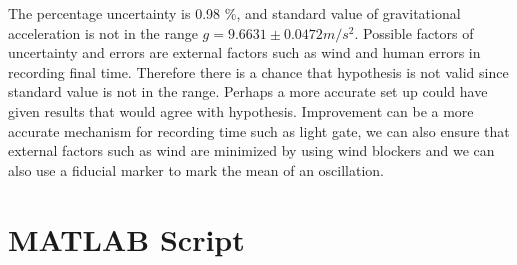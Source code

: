 The percentage uncertainty is 0.98 \%, and standard value of gravitational acceleration is not in the range $ g = 9.6631  \pm 0.0472 m/s^2$. Possible factors of uncertainty and errors are external factors such as wind and human errors in recording final time. Therefore there is a chance that hypothesis is not valid since standard value is not in the range. Perhaps a more accurate set up could have given results that would agree with hypothesis. Improvement can be a more accurate mechanism for recording time such as light gate, we can also ensure that external factors such as wind are minimized by using wind blockers and we can also use a fiducial marker to mark the mean of an oscillation. 



\section{MATLAB Script}





